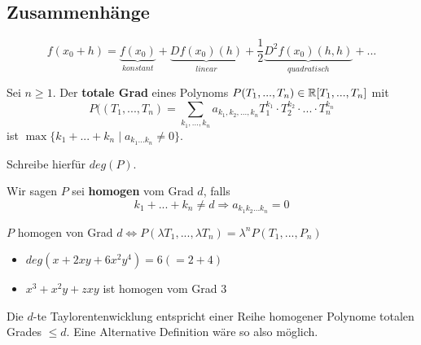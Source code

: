 \documentclass[main.tex]{subfiles}
\begin{document}
\subsection{Zusammenhänge}

$$f(x_0+ h) = \underbrace{f(x_0)}_{konstant} + \underbrace{Df(x_0)(h)}_{linear} + \dfrac{1}{2}\underbrace{D^2f(x_0)(h,h)}_{quadratisch} + ... $$

\begin{Definition}
  Sei $n \geq 1$. Der \textbf{totale Grad} eines Polynoms $P(T_1,...,T_n) \in \mathbb{R}[T_1,...,T_n]$ mit
  $$P((T_1,...,T_n) = \sum \limits_{k_1,...,k_n} a_{k_1,k_2,...,k_n} T_1^{k_1} \cdot T_2^{k_2} \cdot ... \cdot T_n^{k_n}$$
  ist $\max\{k_1 + ... + k_n \mid a_{k_1...k_n} \neq 0\}$.

  Schreibe hierfür $deg(P)$.

  Wir sagen $P$ sei \textbf{homogen} vom Grad $d$, falls
  $$k_1 + ... + k_n \neq d \Rightarrow a_{k_1k_2...k_n} = 0$$

  $P$ homogen von Grad $d \Leftrightarrow P(\lambda T_1, ..., \lambda T_n) = \lambda^n P(T_1,...,P_n)$
\end{Definition}

\begin{Beispiel}
  \begin{itemize}
    \item $deg(x + 2xy + 6x^2y^4) = 6 (= 2+4)$
    \item $x^3 + x^2 y + zxy$ ist homogen vom Grad $3$
  \end{itemize}
\end{Beispiel}

\begin{Bemerkung}
  Die $d$-te Taylorentenwicklung entspricht einer Reihe homogener Polynome totalen Grades $\leq d$. Eine Alternative Definition wäre so also möglich.
\end{Bemerkung}
\end{document}

